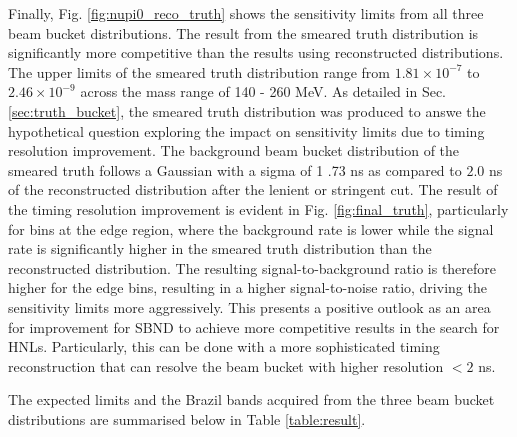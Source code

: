 Finally, Fig. \ref{fig:nupi0_reco_truth} shows the sensitivity limits from all three beam bucket distributions.
The result from the smeared truth distribution is significantly more competitive than the results using reconstructed distributions.
The upper limits of the smeared truth distribution range from $1.81 \times 10^{-7}$ to $2.46 \times 10^{-9}$ across the mass range of 140 - 260 MeV. 
As detailed in Sec. \ref{sec:truth_bucket}, the smeared truth distribution was produced to answe
 the hypothetical question exploring the impact on sensitivity limits due to timing resolution improvement. 
The background beam bucket distribution of the smeared truth follows a Gaussian with a sigma of 1
.73 ns as compared to $2.0$ ns of the reconstructed distribution after the lenient or stringent cut.
The result of the timing resolution improvement is evident in Fig. \ref{fig:final_truth}, particularly for bins at the edge region, where the background rate is lower while the signal rate is significantly higher in the smeared truth distribution than the reconstructed distribution.
The resulting signal-to-background ratio is therefore higher for the edge bins, resulting in a higher signal-to-noise ratio, driving the sensitivity limits more aggressively. 
This presents a positive outlook as an area for improvement for SBND to achieve more competitive results in the search for HNLs.
Particularly, this can be done with a more sophisticated timing reconstruction that can resolve the beam bucket with higher resolution $< 2$ ns.

The expected limits and the Brazil bands acquired from the three beam bucket distributions are summarised below in Table \ref{table:result}.  

